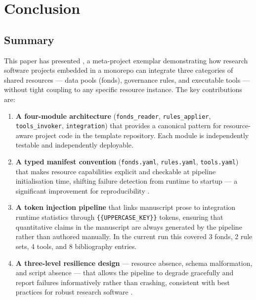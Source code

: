 \documentclass[
]{article}
\begin{document}
\newpage

\section{Conclusion}\label{sec:conclusion}

\subsection{Summary}\label{summary}

This paper has presented , a
meta-project exemplar demonstrating how research software projects
embedded in a monorepo can integrate three categories of shared
resources --- data pools (fonds), governance rules, and executable tools
--- without tight coupling to any specific resource instance. The key
contributions are:

\begin{enumerate}
\def\labelenumi{\arabic{enumi}.}
\item
  \textbf{A four-module architecture} (\texttt{fonds\_reader},
  \texttt{rules\_applier}, \texttt{tools\_invoker},
  \texttt{integration}) that provides a canonical pattern for
  resource-aware project code in the template repository. Each module is
  independently testable and independently deployable.
\item
  \textbf{A typed manifest convention} (\texttt{fonds.yaml},
  \texttt{rules.yaml}, \texttt{tools.yaml}) that makes resource
  capabilities explicit and checkable at pipeline initialisation time,
  shifting failure detection from runtime to startup --- a significant
  improvement for reproducibility \citep{Wilson2014best}.
\item
  \textbf{A token injection pipeline} that links manuscript prose to
  integration runtime statistics through \texttt{\{\{UPPERCASE\_KEY\}\}}
  tokens, ensuring that quantitative claims in the manuscript are always
  generated by the pipeline rather than authored manually. In the
  current run this covered 3 fonds, 2 rule sets, 4 tools, and 8
  bibliography entries.
\item
  \textbf{A three-level resilience design} --- resource absence, schema
  malformation, and script absence --- that allows the pipeline to
  degrade gracefully and report failures informatively rather than
  crashing, consistent with best practices for robust research software
  \citep{Taschuk2017ten}.
\end{enumerate}
\end{document}
